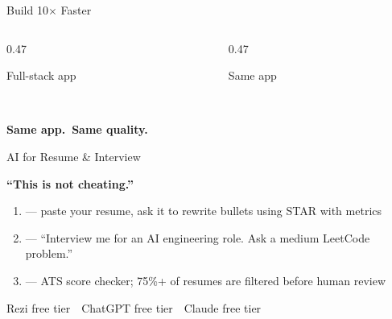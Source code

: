 \begin{frame}{Build 10$\times$ Faster}
\begin{columns}[T]
  \begin{column}{0.47\textwidth}
    \begin{highlightbox}[2020]
      \footnotesize\centering
      Full-stack app\\[0.4em]
      \\[0.3em]
    \end{highlightbox}
  \end{column}
  \begin{column}{0.47\textwidth}
    \begin{keybox}[2026]
      \footnotesize\centering
      Same app\\[0.4em]
      \\[0.3em]
    \end{keybox}
  \end{column}
\end{columns}
\vspace{1.2em}
\begin{center}
  {\large\bfseries Same app.\ Same quality.\ }
\end{center}
\end{frame}

\begin{frame}{AI for Resume \& Interview}
\begin{center}
  {\large\bfseries ``This is not cheating.''}
\end{center}
\vspace{0.4em}
\begin{enumerate}
  \item {} — paste your resume, ask it to rewrite bullets using STAR with metrics
  \item {} — ``Interview me for an AI engineering role. Ask a medium LeetCode problem.''
  \item {} — ATS score checker; 75\%+ of resumes are filtered before human review
\end{enumerate}
\vspace{0.4em}
\begin{keybox}[]
  \footnotesize\centering
  Rezi free tier\ \textperiodcentered\ ChatGPT free tier\ \textperiodcentered\ Claude free tier\\
\end{keybox}
\end{frame}


